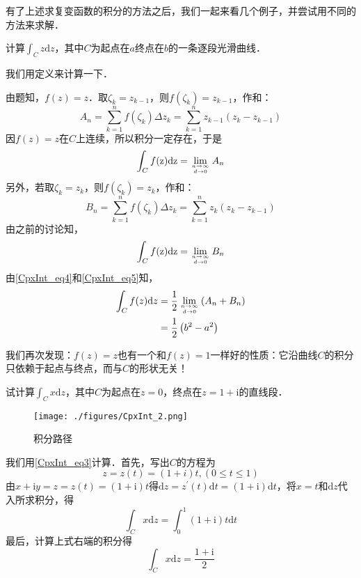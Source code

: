 有了上述求复变函数的积分的方法之后，我们一起来看几个例子，并尝试用不同的方法来求解．
\begin{example}{}
计算$\displaystyle \int _ C z \mathrm dz$，其中$C$为起点在$a$终点在$b$的一条逐段光滑曲线．

我们用定义来计算一下．

由题知，$f(z)=z$．取$\zeta_k=z_{k-1}$，则$f\left(\zeta_{k}\right)=z_{k-1}$，作和：
\begin{equation}
A_{n}=\sum_{k=1}^{n} f\left(\zeta_{k}\right) \Delta z_{k}=\sum_{k=1}^{n} z_{k-1}\left(z_{k}-z_{k-1}\right)
\end{equation}
因$f(z)=z$在$C$上连续，所以积分一定存在，于是
\begin{equation} \label{CpxInt_eq4}
\int_{C} f(\mathrm{z}) \mathrm{d} \mathrm{z}=\lim _{n \rightarrow \infty \atop d \rightarrow 0} A_{n}
\end{equation}
另外，若取$\zeta_k=z_k$，则$f\left(\zeta_{k}\right)=z_{k}$，作和：
\begin{equation}
B_{n}=\sum_{k=1}^{n} f\left(\zeta_{k}\right) \Delta z_{k}=\sum_{k=1}^{n} z_{k}\left(z_{k}-z_{k-1}\right)
\end{equation}
由之前的讨论知，
\begin{equation}\label{CpxInt_eq5}
\int_{C} f(\mathrm{z}) \mathrm{d} \mathrm{z}=\lim _{n \rightarrow \infty \atop d \rightarrow 0} B_{n}
\end{equation}
由\autoref{CpxInt_eq4}和\autoref{CpxInt_eq5}知，
\begin{equation}
\begin{aligned} \int_{C} f(z) \mathrm{d} z &=\frac{1}{2} \lim _{n \rightarrow \infty \atop d \rightarrow 0}\left(A_{n}+B_{n}\right) \\ &=\frac{1}{2}\left(b^{2}-a^{2}\right) \end{aligned}
\end{equation}
\end{example}
我们再次发现：$f (z) = z$也有一个和$f(z)=1$一样好的性质：它沿曲线$C$的积分只依赖于起点与终点，而与$C $的形状无关！

\begin{example}{} \label{CpxInt_ex1}
试计算$\displaystyle \int_{C} x \mathrm{d} z$，其中$C$为起点在$z = 0$，终点在$z =1+\mathrm i$的直线段．
\begin{figure}[ht]
\centering
\texttt{[image: ./figures/CpxInt\_2.png]}
\caption{积分路径} \label{CpxInt_fig2}
\end{figure}

我们用\autoref{CpxInt_eq3}计算．首先，写出$C$的方程为
\begin{equation}
z=z(t)=(1+i) t,(0 \leqslant t \leqslant 1)
\end{equation}
由$x+\mathrm{i} y=z=z(t)=(1+\mathrm{i}) t$得$\mathrm{d} z=z^{\prime}(t) \mathrm{d} t=(1+\mathrm{i}) \mathrm{d} t$，将$x=t$和$\mathrm dz$代入所求积分，得
\begin{equation}
\int_{C} x \mathrm{d} z=\int_{0}^{1}(1+\mathrm{i}) t \mathrm{d} t
\end{equation}
最后，计算上式右端的积分得
\begin{equation}
\int_{C} x \mathrm{d} z=\frac{1+\mathrm{i}}{2}
\end{equation}
\end{example}

